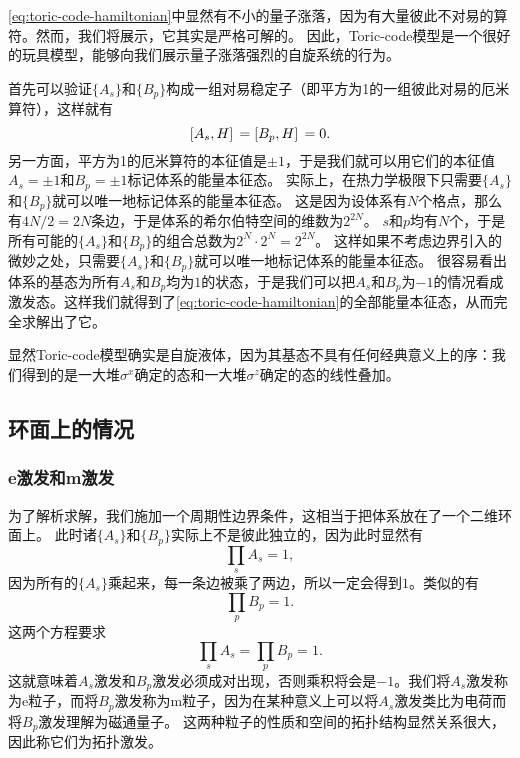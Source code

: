 \eqref{eq:toric-code-hamiltonian}中显然有不小的量子涨落，因为有大量彼此不对易的算符。然而，我们将展示，它其实是严格可解的。
因此，Toric-code模型是一个很好的玩具模型，能够向我们展示量子涨落强烈的自旋系统的行为。

首先可以验证$\{{A}_s\}$和$\{{B}_p\}$构成一组对易稳定子（即平方为1的一组彼此对易的厄米算符），这样就有
\begin{equation}
    \comm*{{A}_s}{{H}} = \comm*{{B}_p}{{H}} = 0.
\end{equation}
另一方面，平方为1的厄米算符的本征值是$\pm 1$，于是我们就可以用它们的本征值$A_s = \pm 1$和$B_p = \pm 1$标记体系的能量本征态。
实际上，在热力学极限下只需要$\{A_s\}$和$\{B_p\}$就可以唯一地标记体系的能量本征态。
这是因为设体系有$N$个格点，那么有$4N/2=2N$条边，于是体系的希尔伯特空间的维数为$2^{2N}$。%
$s$和$p$均有$N$个，于是所有可能的$\{A_s\}$和$\{B_p\}$的组合总数为$2^N \cdot 2^N=2^{2N}$。
这样如果不考虑边界引入的微妙之处，只需要$\{A_s\}$和$\{B_p\}$就可以唯一地标记体系的能量本征态。
很容易看出体系的基态为所有$A_s$和$B_p$均为$1$的状态，于是我们可以把$A_s$和$B_p$为$-1$的情况看成激发态。这样我们就得到了\eqref{eq:toric-code-hamiltonian}的全部能量本征态，从而完全求解出了它。

显然Toric-code模型确实是自旋液体，因为其基态不具有任何经典意义上的序：我们得到的是一大堆$\sigma^x$确定的态和一大堆$\sigma^z$确定的态的线性叠加。

\subsection{环面上的情况}

\subsubsection{e激发和m激发}

为了解析求解，我们施加一个周期性边界条件，这相当于把体系放在了一个二维环面上。
此时诸$\{A_s\}$和$\{B_p\}$实际上不是彼此独立的，因为此时显然有
\[
    \prod_s {A}_s = 1,
\]
因为所有的$\{A_s\}$乘起来，每一条边被乘了两边，所以一定会得到$1$。类似的有
\[
    \prod_p {B}_p = 1.
\]
这两个方程要求
\begin{equation}
    \prod_{s} A_s = \prod_{p} B_p = 1.
    \label{eq:toric-code-pair-condition}
\end{equation}
这就意味着$A_s$激发和$B_p$激发必须成对出现，否则乘积将会是$-1$。我们将$A_s$激发称为e粒子，而将$B_p$激发称为m粒子，因为在某种意义上可以将$A_s$激发类比为电荷而将$B_p$激发理解为磁通量子。
这两种粒子的性质和空间的拓扑结构显然关系很大，因此称它们为拓扑激发。


